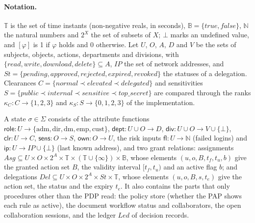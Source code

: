 \documentclass[sigconf,review,anonymous]{acmart}
\newcommand{\role}{\mathsf{role}}
\newcommand{\emp}{\mathrm{emp}}
\begin{document}
\paragraph{Notation.} $\mathbb{T}$ is the set of time instants (non-negative reals, in seconds),
$\mathbb{B}=\{\mathit{true},\mathit{false}\}$, $\mathbb{N}$ the natural numbers and $2^X$ the set of subsets of $X$;
$\bot$ marks an undefined value, and $[\varphi]$ is 1 if $\varphi$ holds and 0 otherwise. Let $U$, $O$, $A$, $D$ and
$V$ be the sets of subjects, objects, actions, departments and divisions, with
$\{\mathit{read},\mathit{write},\mathit{download},\mathit{delete}\}\subseteq A$, $\mathit{IP}$ the set of network
addresses, and $\mathit{St}=\{\mathit{pending},\mathit{approved},\mathit{rejected},\mathit{expired},\mathit{revoked}\}$
the statuses of a delegation. Clearances $C=\{\mathit{normal}\prec\mathit{elevated}\prec\mathit{delegated}\}$ and
sensitivities $S=\{\mathit{public}\prec\mathit{internal}\prec\mathit{sensitive}\prec\mathit{top\_secret}\}$ are
compared through the ranks $\kappa_C:C\to\{1,2,3\}$ and $\kappa_S:S\to\{0,1,2,3\}$ of the implementation.

\begin{definition}[State]\label{def:state}
A state $\sigma\in\Sigma$ consists of the attribute functions
$\role:U\to\{\mathrm{adm},\mathrm{dir},\mathrm{dm},\emp,\mathrm{cust}\}$, $\mathsf{dept}:U\cup O\to D$,
$\mathsf{div}:U\cup O\to V\cup\{\bot\}$, $\mathsf{clr}:U\to C$, $\mathsf{sens}:O\to S$, $\mathsf{own}:O\to U$, the
risk inputs $\mathsf{fl}:U\to\mathbb{N}$ (failed logins) and $\mathsf{ip}:U\to\mathit{IP}\cup\{\bot\}$ (last known
address), and two grant relations: assignments $\mathit{Asg}\subseteq U\times O\times 2^A\times\mathbb{T}\times
(\mathbb{T}\cup\{\infty\})\times\mathbb{B}$, whose elements $(u,o,B,t_f,t_u,b)$ give the granted action set $B$,
the validity interval $[t_f,t_u)$ and an active flag $b$; and delegations
$\mathit{Del}\subseteq U\times O\times 2^A\times\mathit{St}\times\mathbb{T}$, whose elements $(u,o,B,s,t_e)$ give
the action set, the status and the expiry $t_e$. It also contains the parts that only procedures other than the
PDP read: the policy store (whether the PAP shows each rule as active), the document workflow status and
collaborators, the open collaboration sessions, and the ledger $\mathit{Led}$ of decision records.
\end{definition}
\end{document}
